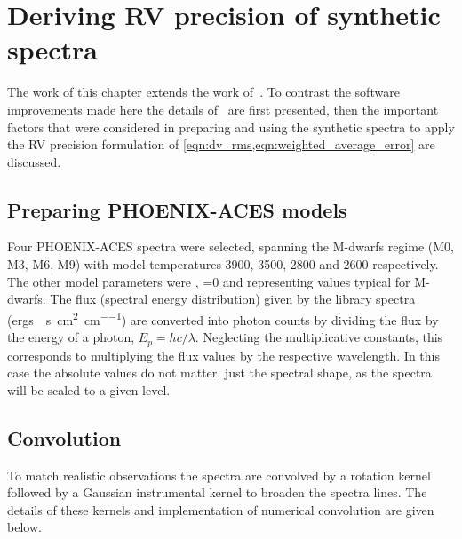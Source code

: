 
\section{Deriving {RV} precision of synthetic spectra}
The work of this chapter extends the work of~\citet{figueira_radial_2016}.
To contrast the software improvements made here the details of~\citet{figueira_radial_2016} are first presented, then the important factors that were considered in preparing and using the synthetic spectra to apply the {RV} precision formulation of \cref{eqn:dv_rms,eqn:weighted_average_error} are discussed.

\subsection{Preparing {PHOENIX-ACES} models}
Four {PHOENIX-ACES} spectra were selected, spanning the M-dwarfs regime (M0, {M3}, {M6}, {M9}) with model temperatures 3900, 3500, 2800 and 2600\K{} respectively.
The other model parameters were , \feh{}=0 and  representing values typical for M-dwarfs.
The flux (spectral energy distribution) given by the library spectra (\si{{ergs} \per\second\per\centi\meter\squared\per\centi\metre}) are converted into photon counts by dividing the flux by the energy of a photon, \({E}_{p}=hc/\lambda\).
Neglecting the multiplicative constants, this corresponds to multiplying the flux values by the respective wavelength.
In this case the absolute values do not matter, just the spectral shape, as the spectra will be scaled to a given \snr{} level.

\subsection{Convolution}
\label{subsec:convolutions}
To match realistic observations the spectra are convolved by a rotation kernel followed by a Gaussian instrumental kernel to broaden the spectra lines.
The details of these kernels and implementation of numerical convolution are given below.

